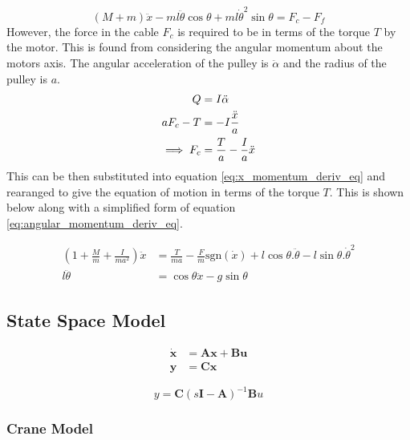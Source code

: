\documentclass{article}
\begin{document}
\begin{equation}
  (M+m)\ddot{x} - ml\ddot{\theta}\cos\theta + ml\dot{\theta}^2\sin\theta = F_c - F_f
  \label{eq:x_momentum_deriv_eq}
\end{equation}
However, the force in the cable $F_c$ is required to be in terms of the torque $T$ by the motor.
This is found from considering the angular momentum about the motors axis. The angular acceleration of the pulley is $\ddot{\alpha}$ and the radius of the pulley is $a$.
\begin{align}
  Q &= I\ddot{\alpha} \notag \\
  aF_c - T &= -I\frac{\ddot{x}}{a} \notag \\
  \implies F_c &= \frac{T}{a} - \frac{I}{a}\ddot{x}
\end{align}
This can be then substituted into equation \ref{eq:x_momentum_deriv_eq} and rearanged to give the equation of motion in terms of the torque $T$.
This is shown below along with a simplified form of equation \ref{eq:angular_momentum_deriv_eq}.

\begin{align}
  \left( 1 + \frac{M}{m} + \frac{I}{ma^2} \right) \ddot{x} &= \frac{T}{ma} - \frac{F}{m}\text{sgn}(\dot{x}) + l\cos\theta . \ddot{\theta} - l\sin\theta . \dot{\theta}^2 \label{eq:motion_1} \\
  l \ddot{\theta} &= \cos\theta \ddot{x} - g\sin\theta \label{eq:motion_2}
\end{align}

\subsection{State Space Model}

\begin{align}
  \mathbf{\dot{x}} &= \mathbf{Ax} + \mathbf{Bu} \\
  \mathbf{y} &= \mathbf{Cx}
\end{align}

\begin{equation} 
  y = \mathbf{C} (s\mathbf{I} - \mathbf{A}) ^{-1} \mathbf{B} u
\end{equation}

\subsubsection{Crane Model}
\end{document}
